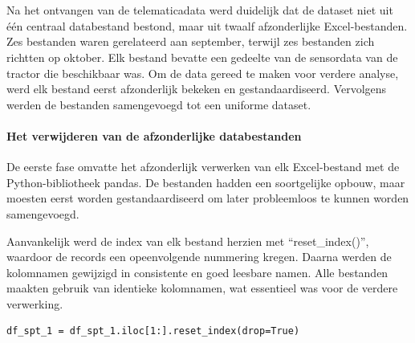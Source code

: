 
\section{}%
\label{sec: Opschoning en voorbereiden van de data}

Na het ontvangen van de telematicadata werd duidelijk dat de dataset niet uit één centraal databestand bestond, maar uit twaalf afzonderlijke Excel-bestanden. Zes bestanden waren gerelateerd aan september, terwijl zes bestanden zich richtten op oktober. Elk bestand bevatte een gedeelte van de sensordata van de tractor die beschikbaar was. Om de data gereed te maken voor verdere analyse, werd elk bestand eerst afzonderlijk bekeken en gestandaardiseerd. Vervolgens werden de bestanden samengevoegd tot een uniforme dataset.

\paragraph{Het verwijderen van de afzonderlijke databestanden}

De eerste fase omvatte het afzonderlijk verwerken van elk Excel-bestand met de Python-bibliotheek pandas. De bestanden hadden een soortgelijke opbouw, maar moesten eerst worden gestandaardiseerd om later probleemloos te kunnen worden samengevoegd.

Aanvankelijk werd de index van elk bestand herzien met ``reset\_index()'', waardoor de records een opeenvolgende nummering kregen. Daarna werden de kolomnamen gewijzigd in consistente en goed leesbare namen. Alle bestanden maakten gebruik van identieke kolomnamen, wat essentieel was voor de verdere verwerking.

\begin{listing}[H]
\begin{verbatim}
df_spt_1 = df_spt_1.iloc[1:].reset_index(drop=True)
\end{verbatim}
\caption[Code snippet: reset index tractordata]{Regel code om de dataset te herindexeren.}
\end{listing}

